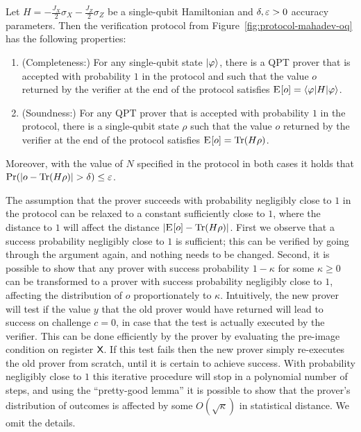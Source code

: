 \begin{proposition}\label{prop:mahadev-oq}
Let $H = -\frac{J_X}{2} \sigma_X -\frac{ J_Z}{2}\sigma_Z$ be a single-qubit Hamiltonian and $\delta,\varepsilon>0$ accuracy parameters. Then the verification protocol from Figure~\ref{fig:protocol-mahadev-oq} has the following properties:
\begin{enumerate}
\item (Completeness:) For any single-qubit state $|\varphi\rangle$, there is a QPT prover that is accepted with probability $1$ in the protocol and such that the value $o$ returned by the verifier at the end of the protocol satisfies $\textsc{E}_{}[o] = \langle\varphi| H |\varphi\rangle$.
\item (Soundness:) For any QPT prover that is accepted with probability  $1$ in the protocol, there is a single-qubit state $\rho$ such that the value $o$ returned by the verifier at the end of the protocol satisfies $\textsc{E}_{}[o] = \mbox{\rm Tr}(H\rho)$. 
\end{enumerate}
Moreover, with the value of $N$ specified in the protocol in both cases it holds that $\Pr(|o-\mbox{\rm Tr}(H\rho)| > \delta)\leq \varepsilon$.
\end{proposition}

\begin{remark}\label{rk:prover-1}
The assumption that the prover succeeds with probability negligibly close to $1$ in the protocol can be relaxed to a constant sufficiently close to $1$, where the distance to $1$ will affect the distance $|\textsc{E}_{}[{o}] - \mbox{\rm Tr}(H\rho)|$. First we observe that a success probability negligibly close to $1$ is sufficient; this can be verified by going through the argument again, and nothing needs to be changed. Second, it is possible to show that any prover with success probability $1-\kappa$ for some $\kappa \geq 0$ can be transformed to a prover with success probability negligibly close to $1$, affecting the distribution of $o$ proportionately to $\kappa$. Intuitively, the new prover will test if the value $y$ that the old prover would have returned will lead to success on challenge $c=0$, in case that the test is actually executed by the verifier. This can be done efficiently by the prover by evaluating the pre-image condition on register ${\textsf{X}}$. If this test fails then the new prover simply re-executes the old prover from scratch, until it is certain to achieve success. With probability negligibly close to $1$ this iterative procedure will stop in a polynomial number of steps, and using the ``pretty-good lemma'' it is possible to show that the prover's distribution of outcomes is affected by some $O(\sqrt{\kappa})$ in statistical distance. We omit the details. 
\end{remark}

